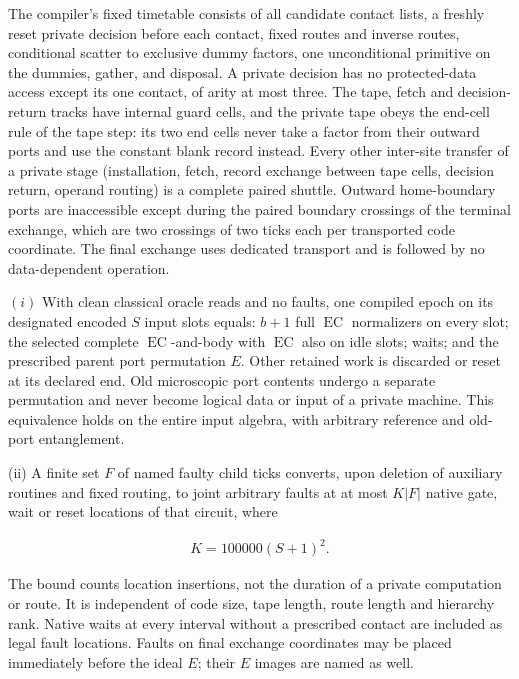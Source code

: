 \begin{lemma}\label{q1:l5}


The compiler's fixed timetable consists of all candidate contact lists, a freshly reset private decision before each contact, fixed routes and inverse routes, conditional scatter to exclusive dummy factors, one unconditional primitive on the dummies, gather, and disposal. A private decision has no protected-data access except its one contact, of arity at most three. The tape, fetch and decision-return tracks have internal guard cells, and the private tape obeys the end-cell rule of the tape step: its two end cells never take a factor from their outward ports and use the constant blank record instead. Every other inter-site transfer of a private stage (installation, fetch, record exchange between tape cells, decision return, operand routing) is a complete paired shuttle. Outward home-boundary ports are inaccessible except during the paired boundary crossings of the terminal exchange, which are two crossings of two ticks each per transported code coordinate. The final exchange uses dedicated transport and is followed by no data-dependent operation.

\((i)\) With clean classical oracle reads and no faults, one compiled epoch on its designated encoded \(S\) input slots equals: \(b+1\) full \(\operatorname{EC}\) normalizers on every slot; the selected complete \(\operatorname{EC}\)-and-body with \(\operatorname{EC}\) also on idle slots; waits; and the prescribed parent port permutation \(E\). Other retained work is discarded or reset at its declared end. Old microscopic port contents undergo a separate permutation and never become logical data or input of a private machine. This equivalence holds on the entire input algebra, with arbitrary reference and old-port entanglement.

(ii) A finite set \(F\) of named faulty child ticks converts, upon deletion of auxiliary routines and fixed routing, to joint arbitrary faults at at most \(K|F|\) native gate, wait or reset locations of that circuit, where

\[
\begin{gathered}
K = 100000(S+1)^{2}.
\end{gathered}
\]

The bound counts location insertions, not the duration of a private computation or route. It is independent of code size, tape length, route length and hierarchy rank. Native waits at every interval without a prescribed contact are included as legal fault locations. Faults on final exchange coordinates may be placed immediately before the ideal \(E\); their \(E\) images are named as well.

\end{lemma}
